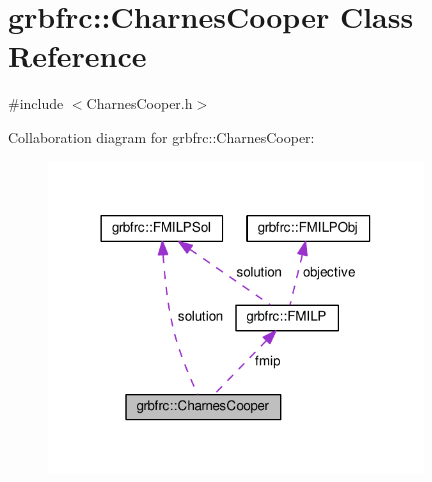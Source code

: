 \hypertarget{classgrbfrc_1_1CharnesCooper}{}\section{grbfrc\+:\+:Charnes\+Cooper Class Reference}
\label{classgrbfrc_1_1CharnesCooper}


{\ttfamily \#include $<$Charnes\+Cooper.\+h$>$}



Collaboration diagram for grbfrc\+:\+:Charnes\+Cooper\+:
\nopagebreak
\begin{figure}[H]
\begin{center}
\leavevmode
\includegraphics[width=282pt]{classgrbfrc_1_1CharnesCooper__coll__graph}
\end{center}
\end{figure}
